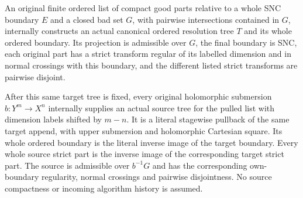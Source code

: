 \begin{theorem}
\label{hir:original-canonical-ordered-resolution-producer}
\leanok
An original finite ordered list of compact good parts relative to a
whole SNC boundary $E$ and a closed bad set $G$, with pairwise
intersections contained in $G$, internally constructs an actual
canonical ordered resolution tree $T$ and its whole ordered boundary.
Its projection is admissible over $G$, the final boundary is SNC,
each original part has a strict transform regular of its labelled
dimension and in normal crossings with this boundary, and the
different listed strict transforms are pairwise disjoint.

After this same target tree is fixed, every original holomorphic
submersion $b:Y^m\to X^n$ internally supplies an actual source tree
for the pulled list with dimension labels shifted by $m-n$. It is a
literal stagewise pullback of the same target append, with upper
submersion and holomorphic Cartesian square. Its whole ordered
boundary is the literal inverse image of the target boundary. Every
whole source strict part is the inverse image of the corresponding
target strict part. The source is admissible over $b^{-1}G$ and has
the corresponding own-boundary regularity, normal crossings and
pairwise disjointness. No source compactness or incoming algorithm
history is assumed.
\end{theorem}
